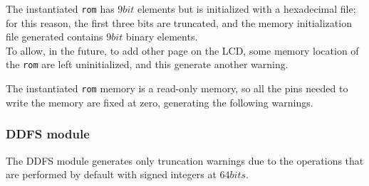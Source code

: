 \begin{warningbox}[Warning]
     \newline {}
\end{warningbox}

\noindent
The instantiated \texttt{rom} has \(9 bit\) elements but is initialized with a hexadecimal file; for this reason, the first three bits are truncated, and the memory initialization file generated contains \(9 bit\) binary elements. \\
To allow, in the future, to add other page on the LCD, some memory location of the \texttt{rom} are left uninitialized, and this generate another warning.

\begin{warningbox}[Warning]
     \newline
     \newline
\end{warningbox}

\newpage
\noindent
The instantiated \texttt{rom} memory is a read-only memory, so all the pins needed to write the memory are fixed at zero, generating the following warnings.

\begin{warningbox}[Warning]
     \newline
     \newline
     \newline
     \newline
     \newline
\end{warningbox}

\subsubsection{DDFS module}
The DDFS module generates only truncation warnings due to the operations that are performed by default with signed integers at \(64 bits\).

